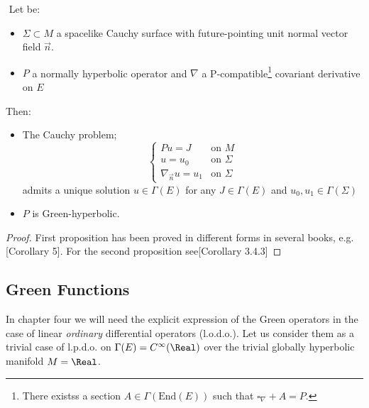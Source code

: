 \documentclass[Main]{subfiles}
\begin{document}
	\begin{theorem}
	$ $
			Let be:
			\begin{itemize}
				\item $\Sigma \subset M$ a spacelike Cauchy surface with future-pointing unit normal vector field $\vec{n}$.
				\item $P$ a normally hyperbolic operator and $\nabla$ a P-compatible\footnote{There existss a section $A \in \Gamma(\textrm{End}(E))$ such that $\square_\nabla + A = P$.} covariant derivative on $E$
			\end{itemize}
		Then:
		\begin{itemize}
			\item The Cauchy problem;
				\begin{displaymath}
					\begin{cases} 
						P u = J & \textrm{on $M$} \\ 
						u = u_0 & \textrm{on $\Sigma$}\\ 
						\nabla_{\vec{n}}u= u_1  & \textrm{on $\Sigma$}
					\end{cases}
				\end{displaymath}
				admits a unique solution $u\in \Gamma(E)$ for any $J\in \Gamma(E)$ and $ u_0,u_1 \in \Gamma(\Sigma)$
			\item $P$ is Green-hyperbolic.
		\end{itemize}
	\end{theorem}	
	\begin{proof}
		First proposition has been proved in different forms in several books, e.g. \cite{Bar2009}[Corollary 5].
		For the second proposition see\cite{Baer2008}[Corollary 3.4.3]
	\end{proof}
	
	\subsection{Green Functions}\label{Section:GreenFunctions}
	In chapter four we will need the explicit expression of the Green operators in the case of linear \textit{ordinary } differential operators (l.o.d.o.). 	
	Let us consider them as a trivial case of l.p.d.o. on $\Gamma(E) = C^\infty(\Real)$ over the trivial globally hyperbolic manifold $M=\Real$.
	
\end{document}
